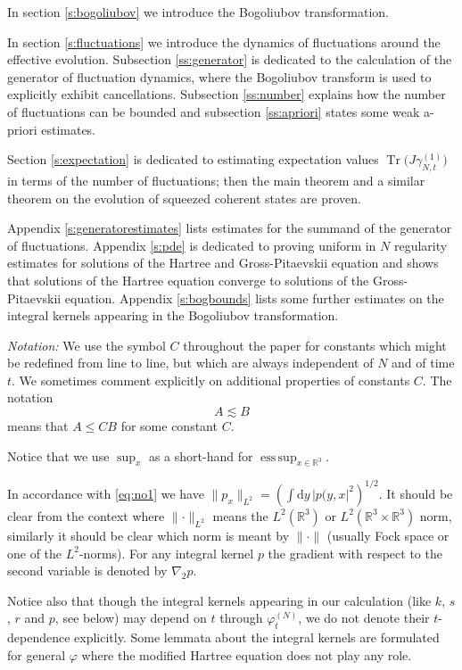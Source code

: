 \documentclass[11pt,a4paper,draft,DIV11]{scrartcl}	%
\newcommand{\di}{\textrm{d}}		%
\newcommand{\Rbb}{\mathbb{R}}		%
\newcommand{\norm}[1]{\lVert#1\rVert}	%
\newcommand{\ph}{\varphi_t^{(N)}}	%
\newcommand{\Tr}{\operatorname{Tr}}	%
\newcommand{\eqr}[1]{\eqref{eq:#1}}			%
\begin{document}
In section \ref{s:bogoliubov} we introduce the Bogoliubov transformation.

In section \ref{s:fluctuations} we introduce the dynamics of fluctuations around the effective evolution. Subsection \ref{ss:generator} is dedicated to the calculation of the generator of fluctuation dynamics, where the Bogoliubov transform is used to explicitly exhibit cancellations. Subsection \ref{ss:number} explains how the number of fluctuations can be bounded and subsection \ref{ss:apriori} states some weak a-priori estimates.

Section \ref{s:expectation} is dedicated to estimating expectation values $\Tr\big(J \gamma_{N,t}^{(1)}\big)$ in terms of the number of fluctuations; then the main theorem and a similar theorem on the evolution of squeezed coherent states are proven.

Appendix \ref{s:generatorestimates} lists estimates for the summand of the generator of fluctuations. Appendix \ref{s:pde} is dedicated to proving uniform in $N$ regularity estimates for solutions of the Hartree and Gross-Pitaevskii equation and shows that solutions of the Hartree equation converge to solutions of the Gross-Pitaevskii equation. Appendix \ref{s:bogbounds} lists some further estimates on the integral kernels appearing in the Bogoliubov transformation.
\newline

\emph{Notation:} We use the symbol $C$ throughout the paper for constants which might be redefined from line to line, but which are always independent of $N$ and of time $t$. We sometimes comment explicitly on additional properties of constants $C$.
The notation
\[
  A \apprle B
\]
means that $A \le C B$ for some constant $C$.

Notice that we use $\sup_x$ as a short-hand for $\operatorname{ess\,sup}_{x\in \Rbb^3}$.

In accordance with \eqr{no1} we have $\norm{p_x}_{L^2} = \left( \int \di y\, \lvert p(y,x\rvert^2 \right)^{1/2}$. It should be clear from the context where $\norm{\cdot}_{L^2}$ means the $L^2(\Rbb^3)$ or $L^2(\Rbb^3 \times \Rbb^3)$ norm, similarly it should be clear which norm is meant by $\norm{\cdot}$ (usually Fock space or one of the $L^2$-norms).
For any integral kernel $p$ the gradient with respect to the second variable is denoted by $\nabla_2 p$.

Notice also that though the integral kernels appearing in our calculation (like $k$, $s$, $r$ and $p$, see below) may depend on $t$ through $\ph$, we do not denote their $t$-dependence explicitly. Some lemmata about the integral kernels are formulated for general $\varphi$ where the modified Hartree equation does not play any role.
\end{document}
